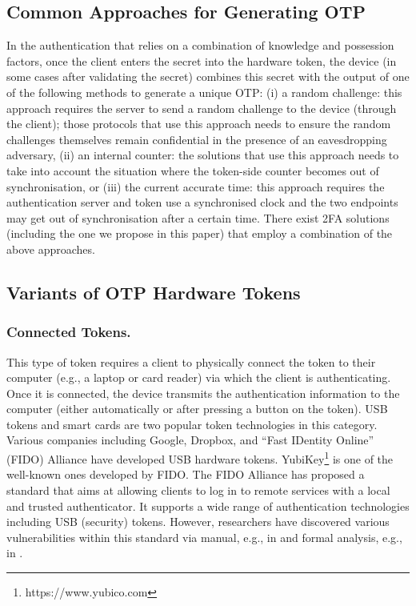 \subsection{Common Approaches for Generating OTP}

In the authentication that relies on a combination of knowledge and possession factors, once the client enters the secret into the hardware token, the device (in some cases after validating the secret) combines this secret with the output of one of the following methods to generate a unique OTP:  (i) a random challenge: this approach requires the server to send a random challenge to the device (through the client); those protocols that use this approach needs to ensure the random challenges themselves remain confidential in the presence of an eavesdropping adversary,  (ii) an internal counter:  the solutions that use this approach needs to take into account the situation where the token-side counter becomes out of synchronisation, or (iii) the current accurate time: this approach requires the authentication server and token use a synchronised clock and the two endpoints may get out of synchronisation after a certain time. There exist 2FA solutions (including the one we propose in this paper) that employ a combination of the above approaches. 
\subsection{Variants of OTP Hardware Tokens}

\subsubsection{Connected Tokens.}
This type of token requires a client to physically connect the token to their computer (e.g., a laptop or card reader) via which the client is authenticating. Once it is connected, the device transmits the authentication information to the computer (either automatically or after pressing a button on the token). USB tokens and smart cards are two popular token technologies in this category.  Various companies including Google, Dropbox, and  ``Fast IDentity Online'' (FIDO) Alliance have developed USB hardware tokens. YubiKey\footnote{https://www.yubico.com} is one of the well-known ones developed by FIDO. The FIDO  Alliance has proposed a standard that aims at allowing clients to log in to remote services with a local and trusted authenticator. It supports a wide range of authentication technologies including USB (security) tokens. However, researchers have discovered various vulnerabilities within this standard via manual, e.g., in \cite{PanosMNPX17,ChangMSS17,LoutfiJ15} and formal analysis, e.g., in \cite{ndss/FengLP021}. 

